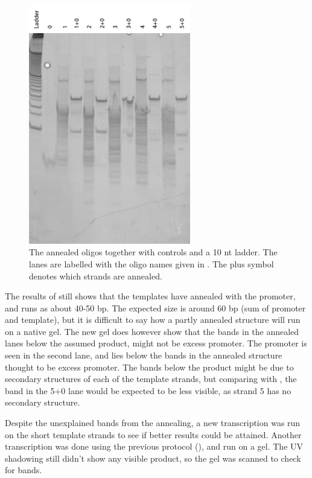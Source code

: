 \begin{figure}[H]
\centering
\includegraphics[width=200pt]{images/translator_annealing_2.png}
\caption{The annealed oligos together with controls and a 10 nt ladder. The lanes are labelled with the oligo names given in . The plus symbol denotes which strands are annealed.}
\label{translator_annealing_2}
\end{figure}

The results of  still shows that the templates have annealed with the promoter, and runs as about 40-50 bp. The expected size is around 60 bp (sum of promoter and template), but it is difficult to say how a partly annealed structure will run on a native gel. The new gel does however show that the bands in the annealed lanes below the assumed product, might not be excess promoter. The promoter is seen in the second lane, and lies below the bands in the annealed structure thought to be excess promoter. The bands below the product might be due to secondary structures of each of the template strands, but comparing with , the band in the 5+0 lane would be expected to be less visible, as strand 5 has no secondary structure.

Despite the unexplained bands from the annealing, a new transcription was run on the short template strands to see if better results could be attained. Another transcription was done using the previous protocol (), and run on a gel. The UV shadowing still didn't show any visible product, so the gel was scanned to check for bands.


